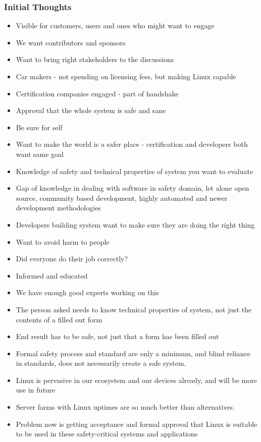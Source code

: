 \documentclass[12pt]{../Common_files/ElisaPaper}
\begin{document}
\subsubsection{Initial Thoughts}
\begin{itemize}
	\item Visible for customers, users and ones who might want to engage
	\item We want contributors and sponsors
	\item Want to bring right stakeholders to the discussions
	\item Car makers - not spending on licensing fees, but making Linux capable
	\item Certification companies engaged - part of handshake
	\item Approval that the whole system is safe and sane
	\item Be sure for self
	\item Want to make the world is a safer place - certification and developers both want same goal
	\item Knowledge of safety and technical properties of system you want to evaluate
	\item Gap of knowledge in dealing with software in safety domain,  let alone open source, community based development,  highly automated and newer development methodologies
	\item Developers building system want to make sure they are doing the right thing
	\item Want to avoid harm to people
	\item Did everyone do their job correctly?
	\item Informed and educated
	\item We have enough good experts working on this
	\item The person asked needs to know technical properties of system,  not just the contents of a filled out form
	\item End result has to be safe,  not just that a form has been filled out
	\item Formal safety process and standard are only a minimum,  
	and blind reliance in standards, does not necessarily create a safe system.
	\item Linux is pervasive in our ecosystem and our devices already,
	and will be more use in future
	\item Server farms with Linux uptimes are so much better than alternatives.   
	\item Problem now is getting acceptance and formal approval that Linux is suitable to be used in these safety-critical systems and applications 
\end{itemize}
\end{document}
